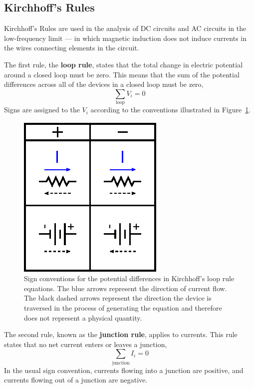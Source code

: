 \documentclass[11pt]{article}
\begin{document}
\subsection{Kirchhoff's Rules}
\label{sec:kirchhoff}

Kirchhoff's Rules are used in the analysis of DC circuits and AC
circuits in the low-frequency limit --- in which magnetic induction
does not induce currents in the wires connecting elements in the
circuit.

The first rule, the \textbf{loop rule}, states that the total change
in electric potential around a closed loop must be zero. This means
that the sum of the potential differences across all of the devices in
a closed loop must be zero,
\begin{equation}
  \sum_\mathrm{loop} V_i = 0
  \label{eq:Loop}
\end{equation}
Signs are assigned to the $V_i$ according to the conventions
illustrated in Figure~\ref{fig:kirchhoffsigns}.

\begin{figure}[ht]
  \begin{center}
    \includegraphics{kirchhoffsigns.eps}
    \caption{Sign conventions for the potential differences in
      Kirchhoff's loop rule equations. The blue arrows represent the
      direction of current flow. The black dashed arrows represent
      the direction the device is traversed in the process of
      generating the equation and therefore does not represent a
      physical quantity.}
    \label{fig:kirchhoffsigns}
  \end{center}
\end{figure}

The second rule, known as the \textbf{junction rule}, applies to
currents. This rule states that no net current enters or leaves a
junction,
\begin{equation}
  \sum_\mathrm{junction} I_i = 0
  \label{eq:junction}
\end{equation}
In the usual sign convention, currents flowing into a junction are
positive, and currents flowing out of a junction are negative. 
\end{document}
